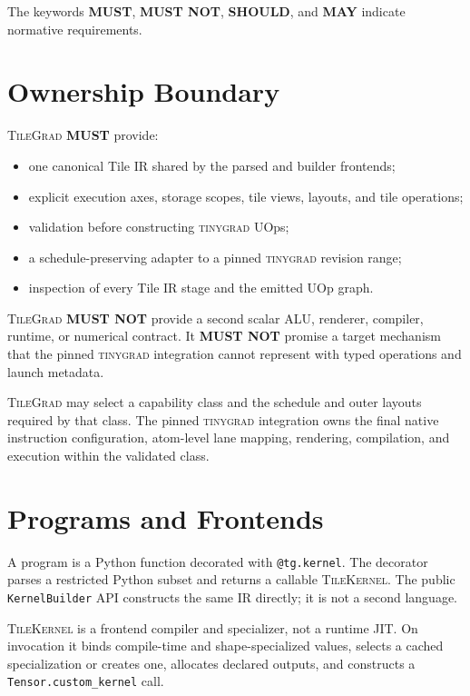 \documentclass[10pt,letterpaper]{article}
\newcommand{\TileGrad}{\textsc{TileGrad}}
\newcommand{\tinygrad}{\textsc{tinygrad}}
\newcommand{\op}[1]{\textsc{#1}}
\newcommand{\must}{\textbf{MUST}}
\newcommand{\mustnot}{\textbf{MUST NOT}}
\newcommand{\should}{\textbf{SHOULD}}
\newcommand{\may}{\textbf{MAY}}
\begin{document}
The keywords \must{}, \mustnot{}, \should{}, and \may{} indicate normative
requirements.

\section*{Ownership Boundary}

\TileGrad{} \must{} provide:

\begin{itemize}
  \item one canonical Tile IR shared by the parsed and builder frontends;
  \item explicit execution axes, storage scopes, tile views, layouts, and tile
        operations;
  \item validation before constructing \tinygrad{} UOps;
  \item a schedule-preserving adapter to a pinned \tinygrad{} revision range;
  \item inspection of every Tile IR stage and the emitted UOp graph.
\end{itemize}

\TileGrad{} \mustnot{} provide a second scalar ALU, renderer, compiler, runtime,
or numerical contract. It \mustnot{} promise a target mechanism that the pinned
\tinygrad{} integration cannot represent with typed operations and launch
metadata.

\TileGrad{} may select a capability class and the schedule and outer layouts
required by that class. The pinned \tinygrad{} integration owns the final native
instruction configuration, atom-level lane mapping, rendering, compilation,
and execution within the validated class.

\section*{Programs and Frontends}

A program is a Python function decorated with \texttt{@tg.kernel}. The
decorator parses a restricted Python subset and returns a callable
\op{TileKernel}. The public \texttt{KernelBuilder} API constructs the same IR
directly; it is not a second language.

\op{TileKernel} is a frontend compiler and specializer, not a runtime JIT. On
invocation it binds compile-time and shape-specialized values, selects a cached
specialization or creates one, allocates declared outputs, and constructs a
\texttt{Tensor.custom\_kernel} call.
\end{document}
